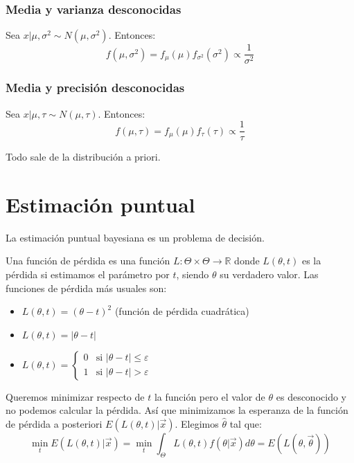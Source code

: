 \subsubsection*{Media y varianza desconocidas}
Sea $x|\mu, \sigma^2 \sim N(\mu, \sigma^2)$.
Entonces:
$$f(\mu, \sigma^2) = f_\mu(\mu)f_{\sigma^2}(\sigma^2) \propto \frac{1}{\sigma^2}$$

\subsubsection*{Media y precisión desconocidas}
Sea $x|\mu, \tau \sim N(\mu, \tau)$.
Entonces:
$$f(\mu, \tau) = f_\mu(\mu)f_\tau(\tau) \propto \frac{1}{\tau}$$

\begin{remark}
    Todo sale de la distribución a priori.
\end{remark}

\section{Estimación puntual}
La estimación puntual bayesiana es un problema de decisión.

Una función de pérdida es una función $L: \Theta \times \Theta \to \mathbb{R}$ donde $L(\theta, t)$ es la pérdida si estimamos el parámetro por $t$, siendo $\theta$ su verdadero valor.
Las funciones de pérdida más usuales son:
\begin{itemize}
    \item $L(\theta, t) = (\theta-t)^2$ (función de pérdida cuadrática)
    \item $L(\theta, t) = |\theta-t|$
    \item $L(\theta, t) = \begin{cases}
                  0 & \text{si } |\theta-t| \leq \varepsilon \\
                  1 & \text{si } |\theta-t| > \varepsilon
              \end{cases}$
\end{itemize}

Queremos minimizar respecto de $t$ la función pero el valor de $\theta$ es desconocido y no podemos calcular la pérdida.
Así que minimizamos la esperanza de la función de pérdida a posteriori $E(L(\theta, t)|\vec{x})$.
Elegimos $\hat{\theta}$ tal que:
$$\min_t E(L(\theta, t)|\vec{x}) = \min_t \int_\Theta L(\theta, t)f(\theta|\vec{x})d\theta = E(L(\theta, \vec{\theta}))$$